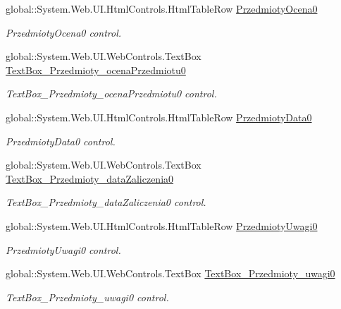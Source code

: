 \begin{DoxyCompactItemize}
global\+::\+System.\+Web.\+U\+I.\+Html\+Controls.\+Html\+Table\+Row \hyperlink{class_dziennik_ocen_web2_1_1_web_form1_a3060dcb1eb46e02e1f02ecfa2700129c}{Przedmioty\+Ocena0}
\begin{DoxyCompactList}\small\item\em Przedmioty\+Ocena0 control. \end{DoxyCompactList}\item 
global\+::\+System.\+Web.\+U\+I.\+Web\+Controls.\+Text\+Box \hyperlink{class_dziennik_ocen_web2_1_1_web_form1_a302ee9498b9e5c0bcf7fe1b8f81f3c5e}{Text\+Box\+\_\+\+Przedmioty\+\_\+ocena\+Przedmiotu0}
\begin{DoxyCompactList}\small\item\em Text\+Box\+\_\+\+Przedmioty\+\_\+ocena\+Przedmiotu0 control. \end{DoxyCompactList}\item 
global\+::\+System.\+Web.\+U\+I.\+Html\+Controls.\+Html\+Table\+Row \hyperlink{class_dziennik_ocen_web2_1_1_web_form1_a94d86e7b2aaea0179abc87aa43c3bbde}{Przedmioty\+Data0}
\begin{DoxyCompactList}\small\item\em Przedmioty\+Data0 control. \end{DoxyCompactList}\item 
global\+::\+System.\+Web.\+U\+I.\+Web\+Controls.\+Text\+Box \hyperlink{class_dziennik_ocen_web2_1_1_web_form1_ae72a9bfae3378226ad33914e0b3ae263}{Text\+Box\+\_\+\+Przedmioty\+\_\+data\+Zaliczenia0}
\begin{DoxyCompactList}\small\item\em Text\+Box\+\_\+\+Przedmioty\+\_\+data\+Zaliczenia0 control. \end{DoxyCompactList}\item 
global\+::\+System.\+Web.\+U\+I.\+Html\+Controls.\+Html\+Table\+Row \hyperlink{class_dziennik_ocen_web2_1_1_web_form1_ae0f27438f74a07309842a272e9010e1b}{Przedmioty\+Uwagi0}
\begin{DoxyCompactList}\small\item\em Przedmioty\+Uwagi0 control. \end{DoxyCompactList}\item 
global\+::\+System.\+Web.\+U\+I.\+Web\+Controls.\+Text\+Box \hyperlink{class_dziennik_ocen_web2_1_1_web_form1_adee12d3b9fb7aed5f516c70ce4d5a114}{Text\+Box\+\_\+\+Przedmioty\+\_\+uwagi0}
\begin{DoxyCompactList}\small\item\em Text\+Box\+\_\+\+Przedmioty\+\_\+uwagi0 control. \end{DoxyCompactList}\item 

\end{DoxyCompactItemize}
